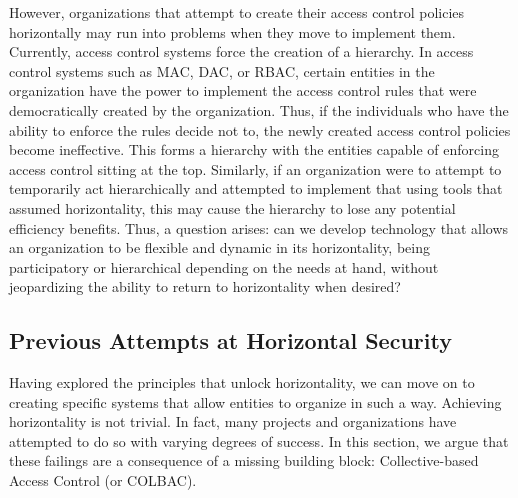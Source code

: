 However, organizations that attempt to create their access control policies
horizontally may run into problems when they move to implement them. Currently,
access control systems force the creation of a hierarchy. In access control
systems such as MAC, DAC, or RBAC, certain entities in the organization have the
power to implement the access control rules that were democratically created by
the organization. Thus, if the individuals who have the ability to enforce the
rules decide not to, the newly created access control policies become
ineffective. This forms a hierarchy with the entities capable of enforcing
access control sitting at the top. Similarly, if an organization were to attempt
to temporarily act hierarchically and attempted to implement that using tools
that assumed horizontality, this may cause the hierarchy to lose any potential
efficiency benefits. Thus, a question arises: can we develop technology that
allows an organization to be flexible and dynamic in its horizontality, being
participatory or hierarchical depending on the needs at hand, without
jeopardizing the ability to return to horizontality when desired?

\subsection{Previous Attempts at Horizontal Security}
\label{sec:previous}
Having explored the principles that unlock horizontality, we can move on to
creating specific systems that allow entities to organize in such a way.
Achieving horizontality is not trivial. In fact, many projects and
organizations have attempted to do so with varying degrees of success. In this
section, we argue that these failings are a consequence of a missing building
block: Collective-based Access Control (or COLBAC).


